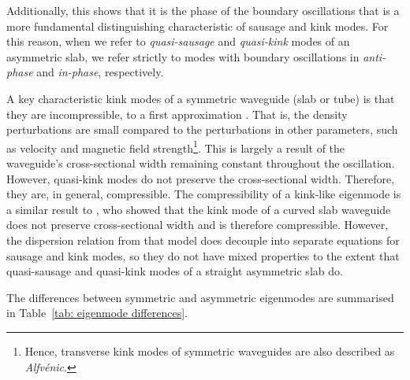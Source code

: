 \documentclass[12pt,draft]{../style-files/ociamthesis}
\begin{document}
Additionally, this shows that it is the phase of the boundary oscillations that is a more fundamental distinguishing characteristic of sausage and kink modes. For this reason, when we refer to \textit{quasi-sausage} and \textit{quasi-kink} modes of an asymmetric slab, we refer strictly to modes with boundary oscillations in \textit{anti-phase} and \textit{in-phase}, respectively.

A key characteristic kink modes of a symmetric waveguide (slab or tube) is that they are incompressible, to a first approximation \citep{goo_etal09}. That is, the density perturbations are small compared to the perturbations in other parameters, such as velocity and magnetic field strength\footnote{Hence, transverse kink modes of symmetric waveguides are also described as \textit{Alfv\'{e}nic}.}. This is largely a result of the waveguide's cross-sectional width remaining constant throughout the oscillation. However, quasi-kink modes do not preserve the cross-sectional width. Therefore, they are, in general, compressible. The compressibility of a kink-like eigenmode is a similar result to \cite{ver_etal06a}, who showed that the kink mode of a curved slab waveguide does not preserve cross-sectional width and is therefore compressible. However, the dispersion relation from that model does decouple into separate equations for sausage and kink modes, so they do not have mixed properties to the extent that quasi-sausage and quasi-kink modes of a straight asymmetric slab do.

The differences between symmetric and asymmetric eigenmodes are summarised in Table~\ref{tab: eigenmode differences}.
\end{document}
